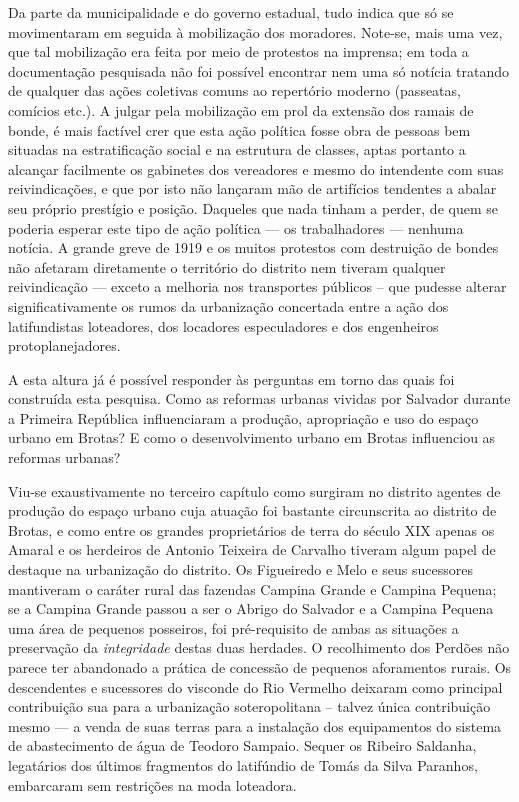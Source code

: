 Da parte da municipalidade e do governo estadual, tudo indica que só se movimentaram em seguida à mobilização dos moradores. Note-se, mais uma vez, que tal mobilização era feita por meio de protestos na imprensa; em toda a documentação pesquisada não foi possível encontrar nem uma só notícia tratando de qualquer das ações coletivas comuns ao repertório moderno (passeatas, comícios etc.). A julgar pela mobilização em prol da extensão dos ramais de bonde, é mais factível crer que esta ação política fosse obra de pessoas bem situadas na estratificação social e na estrutura de classes, aptas portanto a alcançar facilmente os gabinetes dos vereadores e mesmo do intendente com suas reivindicações, e que por isto não lançaram mão de artifícios tendentes a abalar seu próprio prestígio e posição. Daqueles que nada tinham a perder, de quem se poderia esperar este tipo de ação política --- os trabalhadores --- nenhuma notícia. A grande greve de 1919 e os muitos protestos com destruição de bondes não afetaram diretamente o território do distrito nem tiveram qualquer reivindicação --- exceto a melhoria nos transportes públicos -- que pudesse alterar significativamente os rumos da urbanização concertada entre a ação dos latifundistas loteadores, dos locadores especuladores e dos engenheiros protoplanejadores.

A esta altura já é possível responder às perguntas em torno das quais foi construída esta pesquisa. Como as reformas urbanas vividas por Salvador durante a Primeira República influenciaram a produção, apropriação e uso do espaço urbano em Brotas? E como o desenvolvimento urbano em Brotas influenciou as reformas urbanas?

Viu-se exaustivamente no terceiro capítulo como surgiram no distrito agentes de produção do espaço urbano cuja atuação foi bastante circunscrita ao distrito de Brotas, e como entre os grandes proprietários de terra do século XIX apenas os Amaral e os herdeiros de Antonio Teixeira de Carvalho tiveram algum papel de destaque na urbanização do distrito. Os Figueiredo e Melo e seus sucessores mantiveram o caráter rural das fazendas Campina Grande e Campina Pequena; se a Campina Grande passou a ser o Abrigo do Salvador e a Campina Pequena uma área de pequenos posseiros, foi pré-requisito de ambas as situações a preservação da \textit{integridade} destas duas herdades. O recolhimento dos Perdões não parece ter abandonado a prática de concessão de pequenos aforamentos rurais. Os descendentes e sucessores do visconde do Rio Vermelho deixaram como principal contribuição sua para a urbanização soteropolitana -- talvez única contribuição mesmo --- a venda de suas terras para a instalação dos equipamentos do sistema de abastecimento de água de Teodoro Sampaio. Sequer os Ribeiro Saldanha, legatários dos últimos fragmentos do latifúndio de Tomás da Silva Paranhos, embarcaram sem restrições na moda loteadora. 

